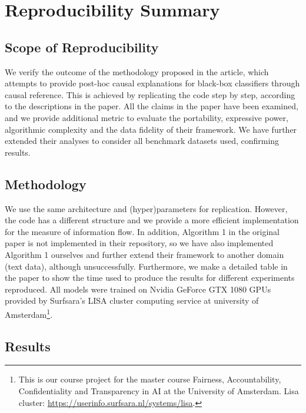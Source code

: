 \section*{\centering Reproducibility Summary}

\subsection*{Scope of Reproducibility}
We verify the outcome of the methodology proposed in the article, which attempts to provide post-hoc causal explanations for black-box classifiers through causal reference. This is achieved by replicating the code step by step, according to the descriptions in the paper. All the claims in the paper have been examined, and we provide additional metric to evaluate the portability, expressive power, algorithmic complexity and the data fidelity of their framework. We have further extended their analyses to consider all benchmark datasets used, confirming results.


\subsection*{Methodology}
We use the same architecture and (hyper)parameters for replication. However, the code has a different structure and we provide a more efficient implementation for the measure of information flow. In addition, Algorithm 1 in the original paper is not implemented in their repository, so we have also implemented Algorithm 1 ourselves and further extend their framework to another domain (text data), although unsuccessfully. Furthermore, we make a detailed table in the paper to show the time used to produce the results for different experiments reproduced. All models were trained on Nvidia GeForce GTX 1080 GPUs provided by Surfsara's LISA cluster computing service at university of Amsterdam\footnote{This is our course project for the master course Fairness, Accountability, Confidentiality and Transparency in AI at the University of Amsterdam. Lisa cluster: \url{https://userinfo.surfsara.nl/systems/lisa}.}. 


\subsection*{Results}

